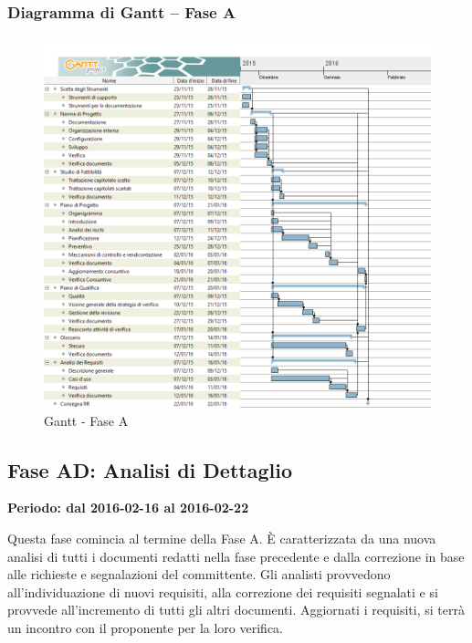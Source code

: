\documentclass[../PianoProgetto.tex]{subfiles}
\begin{document}
		\subsubsection{Diagramma di Gantt – Fase A}
			\begin{figure}[!h]
				\centering
				\includegraphics[width=\textwidth]{gantt_png/1-analisi}
				\caption{Gantt - Fase A}
				\label{fig:Gantt - Fase A}
			\end{figure}			
		
	\subsection{Fase AD: Analisi di Dettaglio}
		\textbf{Periodo: dal 2016-02-16 al 2016-02-22}

				Questa fase comincia al termine della Fase A. È caratterizzata da una nuova analisi di tutti i documenti redatti nella fase precedente e dalla correzione in base alle richieste e segnalazioni del committente. Gli analisti provvedono all’individuazione di nuovi requisiti, alla correzione dei requisiti segnalati e si provvede all’incremento di tutti gli altri documenti.  Aggiornati i requisiti, si terrà un incontro con il proponente per la loro verifica.
			
\end{document}
